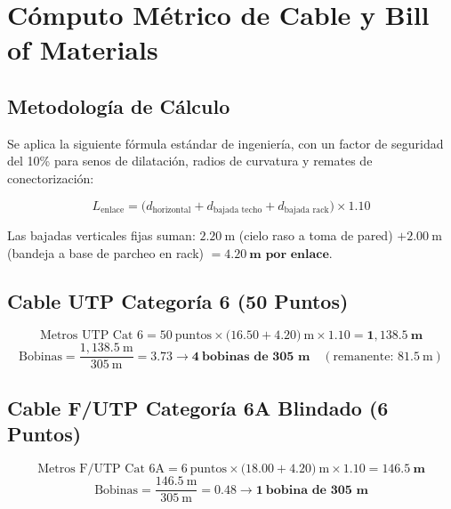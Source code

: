 \section{Cómputo Métrico de Cable y Bill of Materials}

\subsection{Metodología de Cálculo}

Se aplica la siguiente fórmula estándar de ingeniería, con un factor de seguridad del 10\% para senos de dilatación, radios de curvatura y remates de conectorización:

\begin{equation}
L_{\text{enlace}} = \bigl(d_{\text{horizontal}} + d_{\text{bajada techo}} + d_{\text{bajada rack}}\bigr) \times 1.10
\end{equation}

Las bajadas verticales fijas suman: $2.20~\text{m}$ (cielo raso a toma de pared) $+ 2.00~\text{m}$ (bandeja a base de parcheo en rack) $= \mathbf{4.20~\text{m por enlace}}$.

\subsection{Cable UTP Categoría 6 (50 Puntos)}

\begin{equation}
\text{Metros UTP Cat~6} = 50~\text{puntos} \times \bigl(16.50 + 4.20\bigr)~\text{m} \times 1.10 = \mathbf{1{,}138.5~\text{m}}
\end{equation}
\begin{equation}
\text{Bobinas} = \frac{1{,}138.5~\text{m}}{305~\text{m}} = 3.73 \longrightarrow \mathbf{4~\text{bobinas de 305~m}} \quad (\text{remanente: }81.5~\text{m})
\end{equation}

\subsection{Cable F/UTP Categoría 6A Blindado (6 Puntos)}

\begin{equation}
\text{Metros F/UTP Cat~6A} = 6~\text{puntos} \times \bigl(18.00 + 4.20\bigr)~\text{m} \times 1.10 = \mathbf{146.5~\text{m}}
\end{equation}
\begin{equation}
\text{Bobinas} = \frac{146.5~\text{m}}{305~\text{m}} = 0.48 \longrightarrow \mathbf{1~\text{bobina de 305~m}}
\end{equation}

